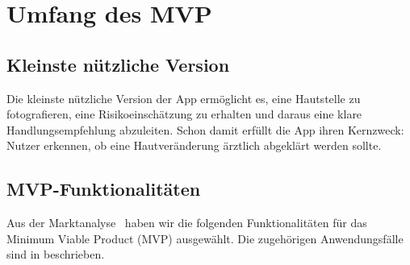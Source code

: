 \section{Umfang des MVP}
\label{chap:mvp}

\subsection{Kleinste nützliche Version}

Die kleinste nützliche Version der App ermöglicht es, eine Hautstelle zu fotografieren, eine Risikoeinschätzung zu erhalten und daraus eine klare Handlungsempfehlung abzuleiten. Schon damit erfüllt die App ihren Kernzweck: Nutzer erkennen, ob eine Hautveränderung ärztlich abgeklärt werden sollte.

\subsection{MVP-Funktionalitäten}
\label{sec:mvp-funktionen}

Aus der Marktanalyse~\cite{marktanalyse2026} haben wir die folgenden Funktionalitäten für das Minimum Viable Product (MVP) ausgewählt. Die zugehörigen Anwendungsfälle sind in  beschrieben.

